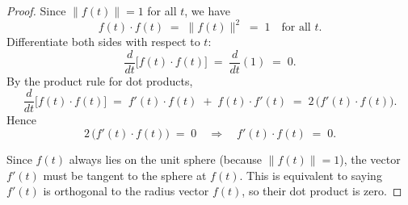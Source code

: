 \documentclass[11pt]{article}
\begin{document}
\begin{exercise}{9.13}
    \begin{proof}
        Since $\lVert f(t)\rVert = 1$ for all $t$, we have
\[
f(t)\cdot f(t) \;=\; \lVert f(t)\rVert^2 \;=\; 1
\quad\text{for all }t.
\]
Differentiate both sides with respect to $t$:
\[
\frac{d}{dt}\bigl[f(t)\cdot f(t)\bigr] 
\;=\;
\frac{d}{dt}(1)
\;=\;
0.
\]
By the product rule for dot products,
\[
\frac{d}{dt}\bigl[f(t)\cdot f(t)\bigr]
\;=\;
f'(t)\cdot f(t) \;+\; f(t)\cdot f'(t)
\;=\;
2\,\bigl(f'(t)\cdot f(t)\bigr).
\]
Hence
\[
2\,\bigl(f'(t)\cdot f(t)\bigr) 
\;=\;
0
\quad\Longrightarrow\quad
f'(t)\cdot f(t)
\;=\;
0.
\]

Since $f(t)$ always lies on the unit sphere (because $\lVert f(t)\rVert=1$), 
the vector $f'(t)$ must be tangent to the sphere at $f(t)$. 
This is equivalent to saying $f'(t)$ is orthogonal to the radius vector $f(t)$, 
so their dot product is zero.
    \end{proof}
\end{exercise}
\end{document}
